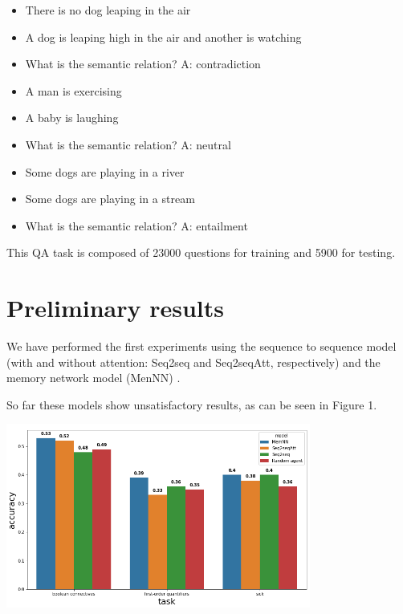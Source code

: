 \begin{itemize} 
\item[] There is no dog leaping in the air
\item[] A dog is leaping high in the air and another is watching
\item[] What is the semantic relation? A: contradiction
\end{itemize}

\begin{itemize} 
\item[] A man is exercising
\item[] A baby is laughing
\item[] What is the semantic relation? A: neutral
\end{itemize}

\begin{itemize} 
\item[] Some dogs are playing in a river
\item[] Some dogs are playing in a stream
\item[] What is the semantic relation? A: entailment
\end{itemize}

This QA task is composed of 23000 questions for training and 5900 for testing.

\section{Preliminary results}
\label{ch:03-preliminary-results}

We have performed the first experiments using the sequence to sequence model \cite{Sustskever}(with and without attention: Seq2seq and Seq2seqAtt, respectively) and the memory network model (MenNN) \cite{WestonCB14}.

So far these models show unsatisfactory results, as can be seen in Figure 1.

\begin{center}
\includegraphics[width=10.0cm]{img/comparative_results.png}
\end{center}

